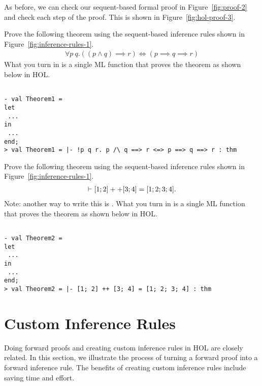 As before, we can check our sequent-based formal proof in
Figure~\ref{fig:proof-2} and check each step of the proof.  This is
shown in Figure~\ref{fig:hol-proof-3}.



\begin{exercise}[\synthesis]
  Prove the following theorem using the sequent-based inference rules
shown in Figure~\ref{fig:inference-rules-1}.
\begin{gather*}
  \forall p\:q.((p \wedge q) \implies r) \Leftrightarrow (p \implies q
  \implies r)
\end{gather*}
What you turn in is a single ML function that proves the theorem as
shown below in HOL.
\begin{session}
\begin{verbatim}

- val Theorem1 =
let
 ...
in
 ... 
end;
> val Theorem1 = |- !p q r. p /\ q ==> r <=> p ==> q ==> r : thm
\end{verbatim}
\end{session}
\end{exercise}

\begin{exercise}[\synthesis]
  Prove the following theorem using the sequent-based inference rules
shown in Figure~\ref{fig:inference-rules-1}.
\begin{gather*}
  \vdash {[1;2] ++ [3;4] = [1;2;3;4]}.
\end{gather*}
Note: another way to write this is .  What you turn in is a single ML function that proves
the theorem as shown below in HOL.
\begin{session}
\begin{verbatim}

- val Theorem2 =
let
 ...
in
 ...
end;
> val Theorem2 = |- [1; 2] ++ [3; 4] = [1; 2; 3; 4] : thm
\end{verbatim}
\end{session}
\end{exercise}

\section{Custom Inference Rules}
\label{sec:custom-rules}

Doing forward proofs and creating custom inference rules in HOL are
closely related. In this section, we illustrate the process of turning
a forward proof into a forward inference rule. The benefits of
creating custom inference rules include saving time and effort.

